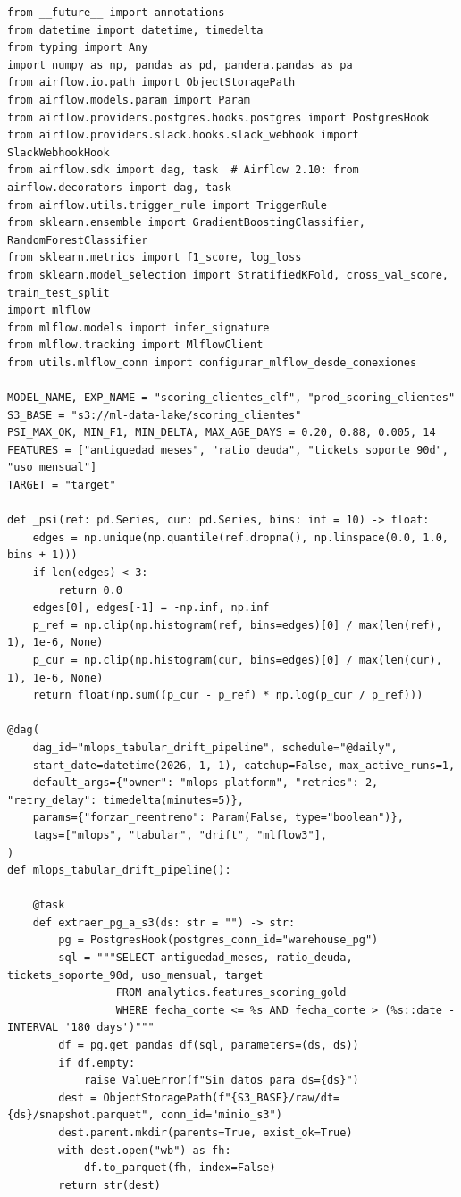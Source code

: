 \begin{lstlisting}[style=python, basicstyle=\ttfamily\scriptsize\color{CodeIdentifier}, caption={DAG de producción \code{mlops\_tabular\_drift\_pipeline}: extracción a S3, validación Pandera, branch por PSI, HPO en MLflow y promoción Champion vs. Challenger por Aliases.}, label={lst:dag-mlops-produccion}]
from __future__ import annotations
from datetime import datetime, timedelta
from typing import Any
import numpy as np, pandas as pd, pandera.pandas as pa
from airflow.io.path import ObjectStoragePath
from airflow.models.param import Param
from airflow.providers.postgres.hooks.postgres import PostgresHook
from airflow.providers.slack.hooks.slack_webhook import SlackWebhookHook
from airflow.sdk import dag, task  # Airflow 2.10: from airflow.decorators import dag, task
from airflow.utils.trigger_rule import TriggerRule
from sklearn.ensemble import GradientBoostingClassifier, RandomForestClassifier
from sklearn.metrics import f1_score, log_loss
from sklearn.model_selection import StratifiedKFold, cross_val_score, train_test_split
import mlflow
from mlflow.models import infer_signature
from mlflow.tracking import MlflowClient
from utils.mlflow_conn import configurar_mlflow_desde_conexiones

MODEL_NAME, EXP_NAME = "scoring_clientes_clf", "prod_scoring_clientes"
S3_BASE = "s3://ml-data-lake/scoring_clientes"
PSI_MAX_OK, MIN_F1, MIN_DELTA, MAX_AGE_DAYS = 0.20, 0.88, 0.005, 14
FEATURES = ["antiguedad_meses", "ratio_deuda", "tickets_soporte_90d", "uso_mensual"]
TARGET = "target"

def _psi(ref: pd.Series, cur: pd.Series, bins: int = 10) -> float:
    edges = np.unique(np.quantile(ref.dropna(), np.linspace(0.0, 1.0, bins + 1)))
    if len(edges) < 3:
        return 0.0
    edges[0], edges[-1] = -np.inf, np.inf
    p_ref = np.clip(np.histogram(ref, bins=edges)[0] / max(len(ref), 1), 1e-6, None)
    p_cur = np.clip(np.histogram(cur, bins=edges)[0] / max(len(cur), 1), 1e-6, None)
    return float(np.sum((p_cur - p_ref) * np.log(p_cur / p_ref)))

@dag(
    dag_id="mlops_tabular_drift_pipeline", schedule="@daily",
    start_date=datetime(2026, 1, 1), catchup=False, max_active_runs=1,
    default_args={"owner": "mlops-platform", "retries": 2, "retry_delay": timedelta(minutes=5)},
    params={"forzar_reentreno": Param(False, type="boolean")},
    tags=["mlops", "tabular", "drift", "mlflow3"],
)
def mlops_tabular_drift_pipeline():

    @task
    def extraer_pg_a_s3(ds: str = "") -> str:
        pg = PostgresHook(postgres_conn_id="warehouse_pg")
        sql = """SELECT antiguedad_meses, ratio_deuda, tickets_soporte_90d, uso_mensual, target
                 FROM analytics.features_scoring_gold
                 WHERE fecha_corte <= %s AND fecha_corte > (%s::date - INTERVAL '180 days')"""
        df = pg.get_pandas_df(sql, parameters=(ds, ds))
        if df.empty:
            raise ValueError(f"Sin datos para ds={ds}")
        dest = ObjectStoragePath(f"{S3_BASE}/raw/dt={ds}/snapshot.parquet", conn_id="minio_s3")
        dest.parent.mkdir(parents=True, exist_ok=True)
        with dest.open("wb") as fh:
            df.to_parquet(fh, index=False)
        return str(dest)


\end{lstlisting}
